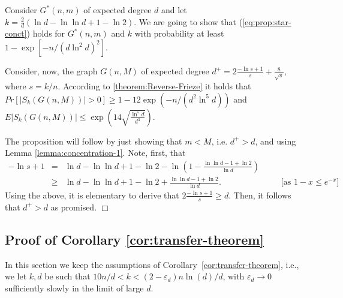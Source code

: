 \documentclass[a4paper,10pt]{article}
\newcommand{\qed}{\hfill$\Box$\smallskip}
\newcommand\eps{\varepsilon}
\newcommand\ra{\rightarrow}
\newcommand\Prop{Proposition}
\newcommand\Cor{Corollary}
\begin{document}
\noindent{\bf Proof of \Prop~\ref{proposition:star-conctration}.}
Consider $G^*(n,m)$ of expected degree $d$ and let $k=\frac{2}{d}
\left(\ln d-\ln\ln d+1-\ln 2 \right)$. We are going to 
show that (\ref{eq:prop:star-conct}) holds for $G^*(n,m)$ and
$k$ with probability at least $1-\exp\left[-n/(d\ln^2d)^2\right]$.

Consider, now, the graph $G(n,M)$ of expected degree 
$d^+=2\frac{-\ln s+1}{s}+\frac{8}{\sqrt{s}}$, where $s=k/n$.
According to \ref{theorem:Reverse-Frieze} it holds that 
$Pr[|S_k(G(n,M))|>0]\geq 1-12\exp\left(-n/(d^2\ln^5d)\right)$
and
$E|S_k(G(n,M))|\leq \exp\left(14\sqrt{\frac{\ln^5d}{d^3}}\right)$.

The proposition will follow by just showing that $m<M$,
i.e. $d^+>d$, and using Lemma \ref{lemma:concentration-1}.
Note, first, that
\begin{eqnarray}
-\ln s+1&=&\ln d-\ln\ln d+1-\ln 2-\ln \left(1-\frac{\ln\ln d-1+\ln 2}{\ln d}\right)\nonumber\\
&\geq & \ln d-\ln\ln d+1-\ln 2+ \frac{\ln\ln d-1+\ln 2}{\ln d}. \hspace{3cm} \mbox{[as $1-x\leq e^{-x}$]}\nonumber 
\end{eqnarray}
Using the above, it is elementary to derive that $2\frac{-\ln s+1}{s}\geq d$.
Then, it follows that $d^+>d$ as promised.
\qed




\subsection{Proof of Corollary \ref{cor:transfer-theorem}}\label{sec:cor:transfer-theorem}

In this section we keep the assumptions of \Cor~\ref{cor:transfer-theorem},
i.e., we let $k,d$ be such that $10 n/d< k<(2-\eps_d)n\ln(d)/d$, with
$\eps_d\ra0$ sufficiently slowly in the limit of large $d$.
\end{document}
